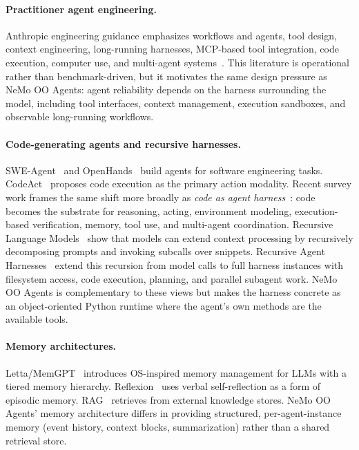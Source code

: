 \documentclass[11pt, logo, onecolumn, copyright, colorlinks=true, allcolors=blue]{nvidiatechreport}
\begin{document}
\paragraph{Practitioner agent engineering.}
Anthropic engineering guidance emphasizes workflows and agents, tool design,
context engineering, long-running harnesses, MCP-based tool integration, code
execution, computer use, and multi-agent systems~\cite{anthropic2024effectiveagents,anthropic2025tools,anthropic2025contextengineering,anthropic2025longrunningharnesses,anthropic2024mcp,anthropic2025codeexecutionmcp,anthropic2025advancedtooluse,anthropic2024computeruse,anthropic2025multiagent}.
This literature is operational rather than benchmark-driven, but it motivates
the same design pressure as NeMo OO Agents: agent reliability depends on the
harness surrounding the model, including tool interfaces, context management,
execution sandboxes, and observable long-running workflows.
\paragraph{Code-generating agents and recursive harnesses.}
SWE-Agent~\cite{yang2024sweagent} and OpenHands~\cite{openhands2024} build
agents for software engineering tasks. CodeAct~\cite{wang2024codeact} proposes
code execution as the primary action modality. Recent survey work frames the same
shift more broadly as \emph{code as agent harness}~\cite{ning2026codeharness}:
code becomes the substrate for reasoning, acting, environment modeling,
execution-based verification, memory, tool use, and multi-agent coordination.
Recursive Language Models~\cite{zhang2025recursive} show that models can
extend context processing by recursively decomposing prompts and invoking
subcalls over snippets. Recursive Agent Harnesses~\cite{lumer2026recursive}
extend this recursion from model calls to full harness instances with filesystem
access, code execution, planning, and parallel subagent work. NeMo OO Agents is
complementary to these views but makes the harness concrete as an
object-oriented Python runtime where the agent's own methods are the available
tools.

\paragraph{Memory architectures.}
Letta/MemGPT~\cite{packer2023memgpt} introduces OS-inspired memory management for
LLMs with a tiered memory hierarchy.
Reflexion~\cite{shinn2023reflexion} uses verbal self-reflection as a form of
episodic memory. RAG~\cite{lewis2020rag} retrieves from external knowledge
stores. NeMo OO Agents' memory architecture differs in providing structured,
per-agent-instance memory (event history, context blocks, summarization) rather
than a shared retrieval store.
\end{document}
